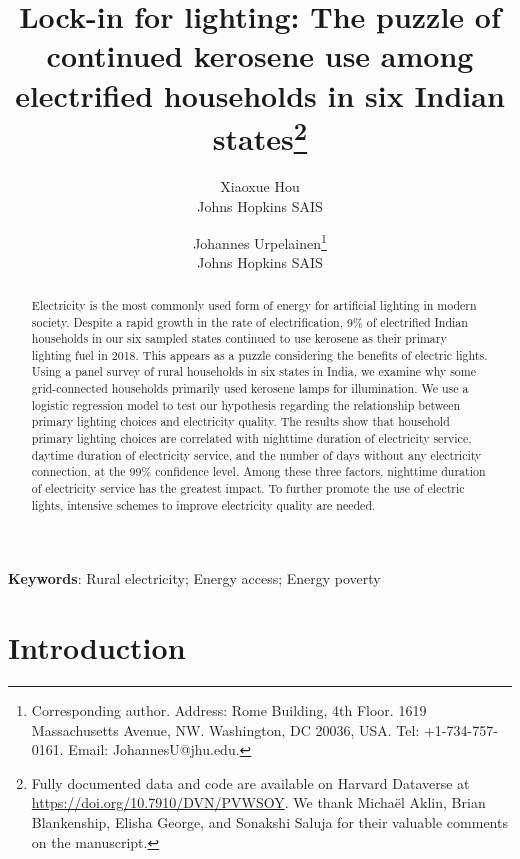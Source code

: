 \documentclass[11pt,english]{article}
\theoremstyle{plain} \newtheorem{claim}{Claim}
\theoremstyle{plain} \newtheorem{prop}{Proposition}
\theoremstyle{plain} \newtheorem{hypo}{Hypothesis}
\begin{document}
\title{Lock-in for lighting: The puzzle of continued kerosene use among electrified households in six Indian states\footnote{Fully documented data and code are available on Harvard Dataverse at \url{https://doi.org/10.7910/DVN/PVWSOY}. We thank Micha\"{e}l Aklin, Brian Blankenship, Elisha George, and Sonakshi Saluja for their valuable comments on the manuscript.}}

\author{Xiaoxue Hou\\Johns Hopkins SAIS \and Johannes Urpelainen\footnote{Corresponding author. Address: Rome Building, 4th Floor. 1619 Massachusetts Avenue, NW. Washington, DC 20036, USA. Tel: +1-734-757-0161. Email: JohannesU@jhu.edu.}\\Johns Hopkins SAIS}
\maketitle


\begin{abstract}

Electricity is the most commonly used form of energy for artificial lighting in modern society. Despite a rapid growth in the rate of electrification, 9\% of electrified Indian households in our six sampled states continued to use kerosene as their primary lighting fuel in 2018. This appears as a puzzle considering the benefits of electric lights. Using a panel survey of rural households in six states in India, we examine why some grid-connected households primarily used kerosene lamps for illumination. We use a logistic regression model to test our hypothesis regarding the relationship between primary lighting choices and electricity quality. The results show that household primary lighting choices are correlated with nighttime duration of electricity service, daytime duration of electricity service, and the number of days without any electricity connection, at the 99\% confidence level. Among these three factors, nighttime duration of electricity service has the greatest impact. To further promote the use of electric lights, intensive schemes to improve electricity quality are needed.

\end{abstract}

\textbf{Keywords}: Rural electricity; Energy access; Energy poverty
\clearpage
\doublespacing

\section{Introduction}
\end{document}
